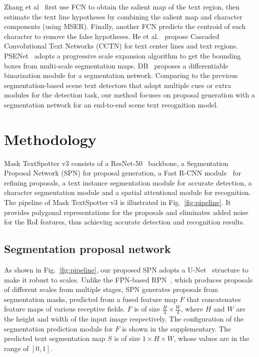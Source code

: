 \documentclass[runningheads]{llncs}
\newcommand{\minisection}[1]{\noindent{\textbf{#1}}}
\begin{document}
\minisection{Segmentation-based scene text detectors}
Zhang et al~\cite{zhang2016multi} first use FCN to obtain the salient map of the text region, then estimate the text line hypotheses by combining the salient map and character components (using MSER). Finally, another FCN predicts the centroid of each character to remove the false hypotheses. 
He et al.~\cite{he2016accurate} propose Cascaded Convolutional Text Networks (CCTN) for text center lines and text regions. PSENet~\cite{wang2019shape} adopts a progressive scale expansion algorithm to get the bounding boxes from multi-scale segmentation maps. DB~\cite{LiaoWYCB20} proposes a differentiable binarization module for a segmentation network. Comparing to the previous segmentation-based scene text detectors that adopt multiple cues or extra modules for the detection task, our method focuses on proposal generation with a segmentation network for an end-to-end scene text recognition model.


\section{Methodology}
Mask TextSpotter v3 consists of a ResNet-50~\cite{he2016deep} backbone, a Segmentation Proposal Network (SPN) for proposal generation, a Fast R-CNN module~\cite{fastrcnn} for refining proposals, a text instance segmentation module for accurate detection, a character segmentation module and a spatial attentional module for recognition. The pipeline of Mask TextSpotter v3 is illustrated in Fig.~\ref{fig:pipeline}. It provides polygonal representations for the proposals and eliminates added noise for the RoI features, thus achieving accurate detection and recognition results.

\subsection{Segmentation proposal network}
As shown in Fig.~\ref{fig:pipeline}, our proposed SPN adopts a U-Net~\cite{ronneberger2015u} structure to make it robust to scales. Unlike the FPN-based RPN~\cite{lin2017feature,ren2015faster}, which produces proposals of different scales from multiple stages, SPN generates proposals from segmentation masks, predicted from a fused feature map $F$ that concatenates feature maps of various receptive fields. $F$ is of size $\frac{H}{4} \times \frac{W}{4}$, where $H$ and $W$ are the height and width of the input image respectively. The configuration of the segmentation prediction module for $F$ is shown in the supplementary. The predicted text segmentation map $S$ is of size $1 \times H \times W$, whose values are in the range of $[0, 1]$.
\end{document}
